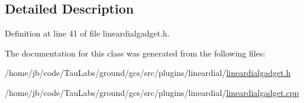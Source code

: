 \subsection{\-Detailed \-Description}


\-Definition at line 41 of file lineardialgadget.\-h.



\-The documentation for this class was generated from the following files\-:\begin{DoxyCompactItemize}
\item 
/home/jb/code/\-Tau\-Labs/ground/gcs/src/plugins/lineardial/\hyperlink{lineardialgadget_8h}{lineardialgadget.\-h}\item 
/home/jb/code/\-Tau\-Labs/ground/gcs/src/plugins/lineardial/\hyperlink{lineardialgadget_8cpp}{lineardialgadget.\-cpp}\end{DoxyCompactItemize}
